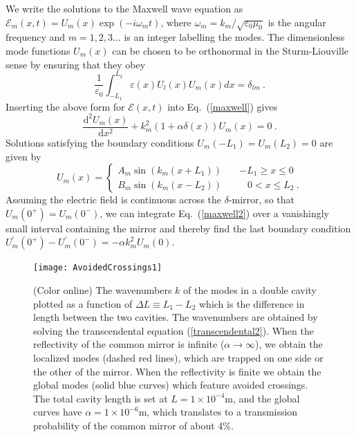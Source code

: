 \documentclass[twocolumn,english,pra,aps,superscriptaddress,floatfix]{revtex4-1}
\begin{document}
We write the solutions to the Maxwell wave equation as $\mathcal{E}_{m}(x,t)=U_{m}(x) \exp(-i\omega_{m}t)$,  where $\omega_{m}=k_{m}/\sqrt{\varepsilon_{0}\mu_{0}}$ is the angular frequency and $m=1,2,3 \ldots$ is an integer labelling the modes. The dimensionless mode functions $U_{m}(x)$ can be chosen to be orthonormal
in the Sturm-Liouville sense by ensuring that they obey
\begin{equation}
\frac{1}{\varepsilon_{0}}\int_{-L_{1}}^{L_{2}}\varepsilon(x)U_{l}(x)U_{m}(x)dx=\delta_{lm} \ .
\label{normalization}
\end{equation}
Inserting the above form for $\mathcal{E}(x,t)$ into Eq.\ (\ref{maxwell}) gives
\begin{equation}
\frac{\mathrm{d}^{2}U_{m}(x)}{\mathrm{d}x^{2}}+k_{m}^{2}(1+\alpha\delta(x))U_{m}(x)=0 \ .
\label{maxwell2}
\end{equation}
Solutions satisfying the boundary conditions $U_{m}(-L_{1})=U_{m}(L_{2})=0$
are given by
\begin{equation}
U_{m}(x)=\begin{cases}
A_{m}\sin(k_{m}(x+L_{1}))\quad & -L_{1} \geq x\leq0\\
B_{m}\sin(k_{m}(x-L_{2}))\quad & \,\:\:\:0<x \leq L_{2} \ . \end{cases}
\label{Wavemode}
\end{equation}
Assuming the electric field is continuous across
the $\delta$-mirror, so that $U_{m}(0^{+})=U_{m}(0^{-})$, we can integrate Eq.\ (\ref{maxwell2}) over a vanishingly small interval containing the mirror and thereby find the last boundary condition
$U_{m}^{\prime}(0^{+})-U_{m}^{\prime}(0^{-})=-\alpha k_{m}^{2}U_{m}(0)$.

\begin{figure}
\texttt{[image: AvoidedCrossings1]}
\caption{(Color online) The wavenumbers $k$ of the modes in a double cavity plotted as a function of $\Delta L \equiv L_{1}-L_{2}$ which is the difference in length between the two cavities.  The wavenumbers are obtained by solving the transcendental equation (\ref{transcendental2}). When the reflectivity of the common mirror is infinite ($\alpha \rightarrow \infty$),  we obtain the localized modes (dashed red lines), which are trapped on one side or the other of the  mirror. When the reflectivity is finite we obtain the global modes (solid blue curves) which feature avoided crossings.  The total cavity length is set at $L=1 \times 10^{-4}$m, and  the global curves have $\alpha = 1 \times 10^{-6}$m, which translates to a transmission probability of the common mirror  of about 4\%. }
\label{fig:avoidedcrossingnet}
\end{figure}
\end{document}
